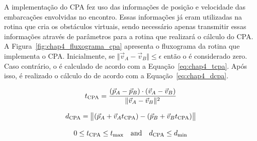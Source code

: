     A implementação do CPA fez uso das informações de posição e velocidade das embarcações envolvidas no encontro. Essas informações já eram utilizadas na rotina que cria os obstáculos virtuais, sendo necessário apenas transmitir essas informações através de parâmetros para a rotina que realizará o cálculo do CPA. A Figura~\ref{fig:chap4_fluxograma_cpa} apresenta o fluxograma da rotina que implementa o CPA. 
    Inicialmente, se $\Vert\vec{v}_{A}-\vec{v}_{B}\Vert\leq\epsilon$ então o \tcpa é considerado zero. Caso contrário, o \tcpa é calculado de acordo com a Equação~\ref{eq:chap4_tcpa}. Após isso, é realizado o cálculo do \dcpa de acordo com a Equação~\ref{eq:chap4_dcpa}. 
    
    \begin{equation}
        t_{\rm CPA} = \frac{(\vec{p}_{A}-\vec{p}_{B})\cdot(\vec{v}_{A}-\vec{v}_{B})}{\Vert\vec{v}_{A}-\vec{v}_{B}\Vert^{2}}
        \label{eq:chap4_tcpa}
    \end{equation}
    
    \begin{equation}
        d_{\rm CPA} =\bigl\Vert (\vec{p}_{A}+\vec{v}_{A}t_{\rm CPA})-(\vec{p}_{B}+\vec{v}_{B}t_{\rm CPA})\bigr\Vert\label{eq:chap4_dcpa}
    \end{equation}
        
    \begin{equation}\label{eq:chap4_cpaThreshold}
        0\leq t_{\rm CPA}\leq t_{\max}\quad{\hbox {and}}\quad d_{\rm CPA}\leq d_{\min}
    \end{equation}
    
